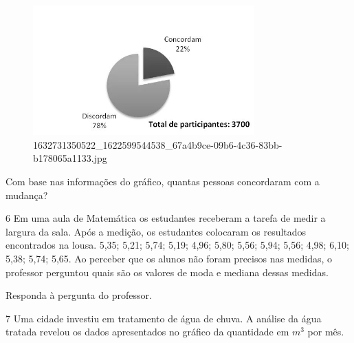 \begin{escolha}
\begin{escolha}
\begin{escolha}
\begin{escolha}
{\begin{boxmedio}
\begin{boxpeq}
\begin{q°}
\begin{boxmedio}
\begin{boxpeq}
\begin{boxpeq}
\begin{boxmedio}
\begin{boxmedio}
\begin{boxmedio}
\begin{largebox}
\begin{figure}
\centering
\includegraphics[width=3.34677in,height=1.96063in]{./_SAEB_9_MAT/media/image215.jpg}
\caption{1632731350522\_1622599544538\_67a4b9ce-09b6-4c36-83bb-b178065a1133.jpg}
\end{figure}


Com base nas informações do gráfico, quantas pessoas concordaram com a mudança?



\num{6} Em uma aula de Matemática os estudantes receberam a tarefa de medir a
largura da sala. Após a medição, os estudantes colocaram os resultados
encontrados na lousa. 5,35; 5,21; 5,74; 5,19; 4,96; 5,80; 5,56; 5,94; 5,56; 
4,98; 6,10; 5,38; 5,74; 5,65. Ao perceber que os alunos não foram precisos nas
medidas, o professor perguntou quais são os valores de moda e mediana dessas medidas.

Responda à pergunta do professor.

\begin{boxmedio}


\num{7} Uma cidade investiu em tratamento de água de chuva. A análise da água
tratada revelou os dados apresentados no gráfico da quantidade em $m^3$ por
mês.


\end{boxmedio}
\end{largebox}
\end{boxmedio}
\end{boxmedio}
\end{boxmedio}
\end{boxpeq}
\end{boxpeq}
\end{boxmedio}
\end{q°}
\end{boxpeq}
\end{boxmedio}}
\end{escolha}
\end{escolha}
\end{escolha}
\end{escolha}
